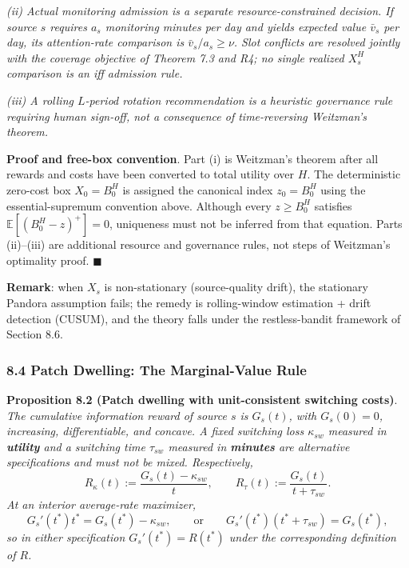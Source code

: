 \documentclass[
  11pt]{article}
\begin{document}
\emph{(ii) Actual monitoring admission is a separate
resource-constrained decision. If source \(s\) requires \(a_s\)
monitoring minutes per day and yields expected value \(\bar v_s\) per
day, its attention-rate comparison is \(\bar v_s/a_s\ge\nu\). Slot
conflicts are resolved jointly with the coverage objective of Theorem
7.3 and R4; no single realized \(X_s^H\) comparison is an iff admission
rule.}

\emph{(iii) A rolling \(L\)-period rotation recommendation is a
heuristic governance rule requiring human sign-off, not a consequence of
time-reversing Weitzman's theorem.}

\textbf{Proof and free-box convention}. Part (i) is Weitzman's theorem
after all rewards and costs have been converted to total utility over
\(H\). The deterministic zero-cost box \(X_0=B_0^H\) is assigned the
canonical index \(z_0=B_0^H\) using the essential-supremum convention
above. Although every \(z\ge B_0^H\) satisfies
\(\mathbb E[(B_0^H-z)^+]=0\), uniqueness must not be inferred from that
equation. Parts (ii)--(iii) are additional resource and governance
rules, not steps of Weitzman's optimality proof. \(\blacksquare\)

\textbf{Remark}: when \(X_s\) is non-stationary (source-quality drift),
the stationary Pandora assumption fails; the remedy is rolling-window
estimation + drift detection (CUSUM), and the theory falls under the
restless-bandit framework of Section 8.6.

\subsubsection{8.4 Patch Dwelling: The Marginal-Value
Rule}\label{patch-dwelling-the-marginal-value-rule}

\textbf{Proposition 8.2 (Patch dwelling with unit-consistent switching
costs)}. \emph{The cumulative information reward of source \(s\) is
\(G_s(t)\), with \(G_s(0)=0\), increasing, differentiable, and concave.
A fixed switching loss \(\kappa_{sw}\) measured in \textbf{utility} and
a switching time \(\tau_{sw}\) measured in \textbf{minutes} are
alternative specifications and must not be mixed. Respectively,}
\[R_\kappa(t):=\frac{G_s(t)-\kappa_{sw}}t,\qquad R_\tau(t):=\frac{G_s(t)}{t+\tau_{sw}}.\]
\emph{At an interior average-rate maximizer,}
\[G_s'(t^*)t^*=G_s(t^*)-\kappa_{sw},\qquad\text{or}\qquad G_s'(t^*)(t^*+\tau_{sw})=G_s(t^*),\]
\emph{so in either specification \(G_s'(t^*)=R(t^*)\) under the
corresponding definition of \(R\).}
\end{document}
